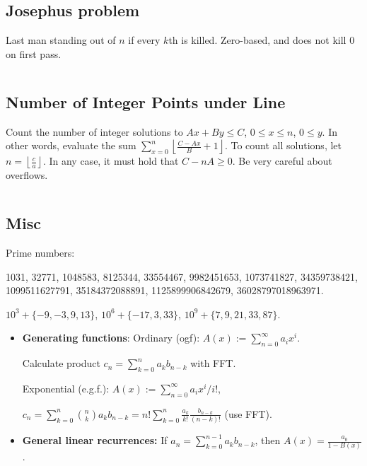 \documentclass[8pt,a4paper,landscape,oneside]{amsart}
\newcommand{\mintedstyle}[2]{\inputminted[fontsize=\normalsize,baselinestretch=.9,breaklines,tabsize=2]{#1}{code/#2}}
\newcommand{\code}[1]{\mintedstyle{cpp}{#1}}
\newenvironment{myitemize}
{\begin{itemize}[leftmargin=.3cm]
	\setlength{\itemsep}{0pt}
	\setlength{\parskip}{0pt}
	\setlength{\parsep}{0pt}     }
{ \end{itemize}                  }
\newif\ifverbose
\begin{document}
\begin{multicols*}{3}
\ifverbose
	\subsection{Summatory Phi}
	The summatory phi function $\Phi(n) = \sum_{i=1}^n \phi(i)$. Let $L\approx
	(n\log{\log{n}})^{2/3}$ and the algorithm runs in $O(n^{2/3})$.
	\code{math/summatory_phi.cpp}
\fi

\subsection{Josephus problem}
Last man standing out of $n$ if every $k$th is killed. Zero-based, and
does not kill $0$ on first pass.
\code{math/josephus.cpp}

\subsection{Number of Integer Points under Line}
Count the number of integer solutions to $Ax+By\leq C$, $0 \leq x \leq
n$, $0 \leq y$. In other words, evaluate the sum $\sum_{x=0}^n
\left\lfloor \frac{C-Ax}{B} + 1\right\rfloor$. To count all solutions,
let $n = \left\lfloor \frac{c}{a}\right\rfloor$. In any case, it must hold
that $C-nA \geq 0$. Be very careful about overflows.
\code{math/floor_sum.cpp}

\subsection{Misc}
Prime numbers:

1031, 32771, 1048583, 8125344, 33554467, 9982451653, 1073741827, 34359738421, 1099511627791, 35184372088891, 1125899906842679, 36028797018963971.

$10^3 + \{-9,-3,9,13\}$, $10^6 + \{-17,3,33\}$, $10^9+ \{7,9,21,33,87\}$.

\begin{myitemize}
	\item \textbf{Generating functions}:
	Ordinary (ogf): $A(x) := \sum_{n=0}^{\infty} a_i x^i$.

	Calculate product $c_n = \sum_{k=0}^{n} a_k b_{n-k}$ with FFT.

	Exponential (e.g.f.): $A(x) := \sum_{n=0}^{\infty} a_i x^i/i!$,

	$c_n = \sum_{k=0}^{n} \binom{n}{k} a_k b_{n-k} = n! \sum_{k=0}^{n} \frac{a_k}{k!} \frac{b_{n-k}}{(n-k)!}$ (use FFT).

\item \textbf{General linear recurrences:}
	If $a_n = \sum_{k=0}^{n-1} a_k b_{n-k}$, then $A(x) = \frac{a_0}{1-B(x)}$.


\end{myitemize}
\end{multicols*}
\end{document}
